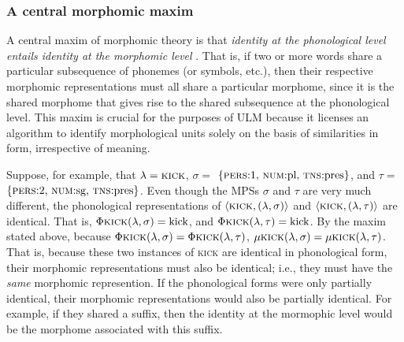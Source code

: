 
\subsubsection{A central morphomic maxim} A central maxim 
of morphomic theory is that \emph{identity at the phonological 
level entails identity at the morphomic level} \citep{round:2011}. 
That is, if two 
or more words share a particular subsequence of phonemes 
(or symbols, etc.), then their respective morphomic representations 
must all share a particular morphome, since it is the shared 
morphome that gives rise to the shared subsequence at the 
phonological level. This maxim is crucial for the purposes 
of \ac{ULM} because it licenses an algorithm to identify 
morphological units solely on the basis of similarities in 
form, irrespective of meaning.

Suppose, for example, that $\lambda = \textsc{kick}$, 
$\sigma =$ $\{\text{\textsc{pers}:1, \textsc{num}:pl, \textsc{tns}:pres} \}$, 
and $\tau =$ $\{\text{\textsc{pers}:2, \textsc{num}:sg, \textsc{tns}:pres}\}$.
Even though the \ac{MPS}s $\sigma$ and $\tau$ are very much different,
the phonological representations of $\langle \textsc{kick}, (\lambda,\sigma) \rangle$
and $\langle \textsc{kick}, (\lambda,\tau) \rangle$ are identical. That is,
$\Phi{\textsc{kick}}(\lambda,\sigma) = \text{kick}$, and 
$\Phi{\textsc{kick}}(\lambda,\tau) = \text{kick}$. By the maxim stated above, because 
$\Phi{\textsc{kick}}(\lambda,\sigma) =  \Phi{\textsc{kick}}(\lambda,\tau)$, 
$\mu{\textsc{kick}}(\lambda,\sigma) = \mu{\textsc{kick}}(\lambda,\tau)$.
That is, because these two instances of \textsc{kick} are identical in 
phonological form, their morphomic representations must also be identical; 
i.e., they must have the \emph{same} morphomic represention. If the 
phonological forms were only partially identical, their morphomic 
representations would also be partially identical. For example, if they 
shared a suffix, then the identity at the mormophic level would 
be the morphome associated with this suffix.

